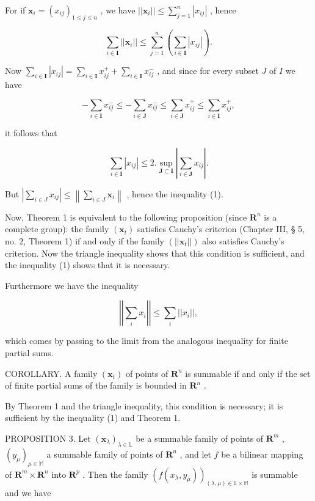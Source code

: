 For if \(\pmb{x}_i = (x_{ij})_{1\leqslant j\leqslant n}\) , we have \(||\pmb{x}_i|| \leqslant \sum_{j=1}^{n} |x_{ij}|\) , hence

\[
\sum_ {i \in \mathbf {I}} | | \boldsymbol {x} _ {i} | | \leqslant \sum_ {j = 1} ^ {n} \left(\sum_ {i \in \mathbf {I}} | x _ {i j} |\right).
\]

Now \(\sum_{i\in \mathbf{I}}|x_{ij}| = \sum_{i\in \mathbf{I}}x_{ij}^{+} + \sum_{i\in \mathbf{I}}x_{ij}^{-}\) , and since for every subset \(J\) of \(I\) we have

\[
- \sum_ {i \in \mathbf {I}} x _ {i j} ^ {-} \leqslant - \sum_ {i \in \mathbf {J}} x _ {i j} ^ {-} \leqslant \sum_ {i \in \mathbf {J}} x _ {i j} ^ {+} \leqslant \sum_ {i \in \mathbf {I}} x _ {i j} ^ {+},
\]

it follows that

\[
\sum_ {i \in \mathbf {I}} | x _ {i j} | \leqslant 2. \sup _ {\mathbf {J} \subset \mathbf {I}} \left| \sum_ {i \in \mathbf {J}} x _ {i j} \right|.
\]

But \(\left|\sum_{i\in J}x_{ij}\right| \leqslant \left\| \sum_{i\in J}\boldsymbol{x}_i\right\|\) , hence the inequality (1).

Now, Theorem 1 is equivalent to the following proposition (since \(\mathbf{R}^n\) is a complete group): the family \((\pmb{x}_t)\) satisfies Cauchy's criterion (Chapter III, § 5, no. 2, Theorem 1) if and only if the family \((||\pmb{x}_t||)\) also satisfies Cauchy's criterion. Now the triangle inequality shows that this condition is sufficient, and the inequality (1) shows that it is necessary.

Furthermore we have the inequality

\[
\left| \left| \sum_ {i} x _ {i} \right| \right| \leqslant \sum_ {i} | | x _ {i} | |,\tag{2}
\]

which comes by passing to the limit from the analogous inequality for finite partial sums.

COROLLARY. A family \((\pmb{x}_t)\) of points of \(\mathbf{R}^n\) is summable if and only if the set of finite partial sums of the family is bounded in \(\mathbf{R}^n\) .

By Theorem 1 and the triangle inequality, this condition is necessary; it is sufficient by the inequality (1) and Theorem 1.

PROPOSITION 3. Let \((\pmb{x}_{\lambda})_{\lambda \in \mathbb{L}}\) be a summable family of points of \(\mathbf{R}^m\) , \((y_{\mu})_{\mu \in \mathbb{M}}\) a summable family of points of \(\mathbf{R}^n\) , and let \(f\) be a bilinear mapping of \(\mathbf{R}^m \times \mathbf{R}^n\) into \(\mathbf{R}^p\) . Then the family \((f(x_{\lambda}, y_{\mu}))_{(\lambda, \mu) \in \mathbb{L} \times \mathbb{M}}\) is summable and we have

